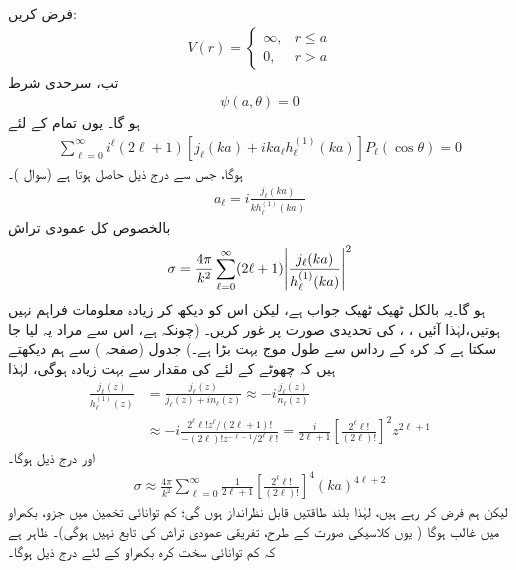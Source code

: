  فرض کریں:
\begin{align}
	V(r)=
	\begin{cases}
		\infty, & r\leq a \\
		0, & r>a 
	\end{cases}
\end{align}
تب، سرحدی شرط 
\begin{align}
	\psi(a, \theta) = 0
\end{align}
ہو گا۔ یوں تمام  کے لئے
\begin{align}\label{مساوات_بکھراو_اے_ایل_الف}
	\sum_{\ell=0}^{\infty}i^{\ell}(2\ell+1)\left[j_{\ell}(ka)+ika_{\ell}h_{\ell}^{(1)}(ka)\right]P_{\ell}(\cos\theta) = 0
\end{align}
ہوگا، جس سے درج ذیل حاصل ہوتا ہے (سوال )۔
\begin{align}\label{مساوات_بکھراو_اے_ایل_ب}
	a_{\ell} = i\frac{j_{\ell}(ka)}{kh_{\ell}^{(1)}(ka)}
\end{align}
بالخصوص کل عمودی تراش
\begin{align}
	\sigma=\frac{4\pi}{k^2}\sum_{\ell=0}^{\infty}(2\ell+1)\abs{\frac{j_{\ell}(ka)}{h_{\ell}^{(1)}(ka)}}^2
\end{align}
ہو گا۔یہ بالکل ٹھیک ٹھیک جواب ہے، لیکن اس کو دیکھ کر زیادہ معلومات فراہم نہیں ہوتیں،لہٰذا آئیں ، ، کی تحدیدی صورت پر غور کریں۔ (چونکہ  ہے، اس سے مراد یہ لیا جا سکتا ہے کہ کرہ کے رداس سے طول موج بہت بڑا ہے۔) جدول  (صفحہ ) سے ہم دیکھتے ہیں کہ چھوٹے  کے لئے  کی مقدار  سے بہت زیادہ ہوگی، لہٰذا 
\begin{align}
	\frac{j_{\ell}(z)}{h_{\ell}^{(1)}(z)} &= \frac{j_{\ell}(z)}{j_{\ell}(z)+in_{\ell}(z)}\approx-i\frac{j_{\ell}(z)}{n_{\ell}(z)}\nonumber \\
	&\approx-i\frac{2^{\ell}\ell!z^{\ell}/(2\ell+1)!}{-(2\ell)!z^{-\ell-1}/2^{\ell}\ell!} = \frac{i}{2\ell+1}\left[\frac{2^{\ell}\ell!}{(2\ell)!}\right]^2z^{2\ell+1}
\end{align}
اور درج ذیل ہوگا۔
\begin{align*}
	\sigma\approx\frac{4\pi}{k^2}\sum_{\ell=0}^{\infty}\frac{1}{2\ell+1}\left[\frac{2^{\ell}\ell!}{(2\ell)!}\right]^4(ka)^{4\ell+2}
\end{align*}
لیکن ہم  فرض کر رہے ہیں، لہٰذا بلند طاقتیں قابل نظرانداز ہوں گی؛ کم توانائی تخمین میں  جزو، بکھراو میں غالب ہوگا ( یوں کلاسیکی صورت کے طرح، تفریقی عمودی تراش  کی تابع نہیں ہوگی)۔ ظاہر ہے کہ کم توانائی سخت کرہ بکھراو کے لئے درج ذیل ہوگا۔
